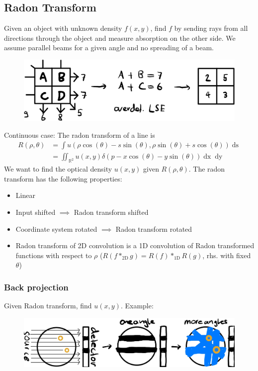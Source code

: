 \documentclass[a4paper,10pt]{article}
\begin{document}
\subsection{Radon Transform}
Given an object with unknown density \(f(x,y)\), find \(f\) by sending rays from all directions through the object and measure absorption on the other side. We assume parallel beams for a given angle and no spreading of a beam.
\begin{figure}[H]
    \center
    \includegraphics[width=0.75\linewidth]{radon-image-reconstruction.jpeg}
\end{figure}
Continuous case: The radon transform of a line is 
\begin{align*}
    R(\rho , \theta) &= \int u(\rho \cos (\theta ) - s \sin (\theta ), \rho \sin (\theta ) + s \cos (\theta )) \mathop{ds} \\&= \iint_{\mathbb{R}^2} u(x,y) \delta (p - x \cos (\theta) - y \sin (\theta) ) \mathop{dx} \mathop{dy}
\end{align*}
We want to find the optical density \( u(x,y) \) given \( R(\rho , \theta ) \).
The radon transform has the following properties:
\begin{itemize}
    \item Linear
    \item Input shifted \(\implies\) Radon transform shifted
    \item Coordinate system rotated \( \implies \) Radon transform rotated
    \item Radon transform of 2D convolution is a 1D convolution of Radon transformed functions with respect to \(\rho\) (\(R(f *_\text{2D} g) = R(f) *_\text{1D} R(g) \), rhs. with fixed \(\theta\))
\end{itemize}

\subsubsection{Back projection}
Given Radon transform, find \(u(x,y)\). Example:
\begin{figure}[h]
    \includegraphics[width=\linewidth]{radon-back-projection.jpeg}
\end{figure}
\end{document}
